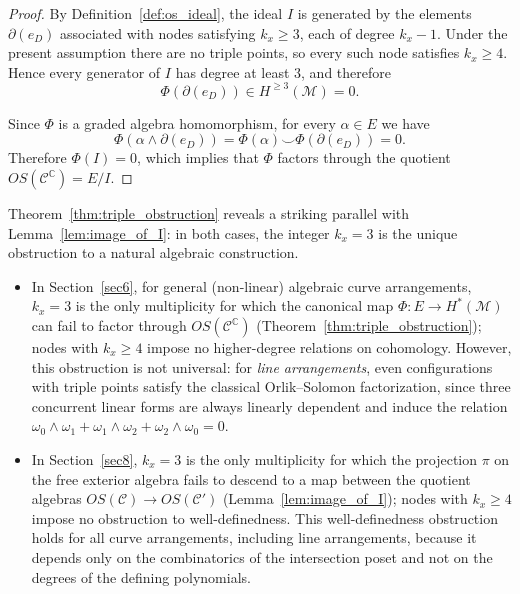 \documentclass[article,11pt]{amsart} \numberwithin{equation}{section}
\numberwithin{equation}{section}
\begin{document}
{\begin{proof}
	By Definition~\ref{def:os_ideal},
	the ideal
	$I$
	is generated by the elements
	$\partial(e_D)$
	associated with nodes satisfying
	$k_x\ge3$,
	each of degree
	$k_x-1$.
	Under the present assumption there are no triple points, so every such node satisfies
	$k_x\ge4$.
	Hence every generator of
	$I$
	has degree at least $3$, and therefore
	\[
	\Phi(\partial(e_D))
	\in
	H^{\ge3}(\mathcal M)
	=
	0.
	\]
	
	Since
	$\Phi$
	is a graded algebra homomorphism,
	for every
	$\alpha\in E$
	we have
	\[
	\Phi(\alpha\wedge\partial(e_D))
	=
	\Phi(\alpha)
	\smile
	\Phi(\partial(e_D))
	=
	0.
	\]
	Therefore
	$\Phi(I)=0$,
	which implies that
	$\Phi$
	factors through the quotient
	$OS(\mathcal C^{\mathbb C})=E/I$.
\end{proof}

\begin{rk}
	\label{rmk:unifying_kx3}
	Theorem~\ref{thm:triple_obstruction} reveals a striking parallel with Lemma~\ref{lem:image_of_I}: in both cases, the integer $k_x=3$ is the unique obstruction to a natural algebraic construction.
	\begin{itemize}
		\item In Section~\ref{sec6}, for general (non-linear) algebraic curve arrangements, $k_x=3$ is the only multiplicity for which the canonical map $\Phi:E\longrightarrow H^*(\mathcal M)$ can fail to factor through $OS(\mathcal C^{\mathbb C})$ (Theorem~\ref{thm:triple_obstruction}); nodes with $k_x\ge4$ impose no higher-degree relations on cohomology. However, this obstruction is not universal: for \emph{line arrangements}, even configurations with triple points satisfy the classical Orlik--Solomon factorization, since three concurrent linear forms are always linearly dependent and induce the relation $\omega_0\wedge\omega_1+\omega_1\wedge\omega_2+\omega_2\wedge\omega_0=0$.
		\item In Section~\ref{sec8}, $k_x=3$ is the only multiplicity for which the projection $\pi$ on the free exterior algebra fails to descend to a map between the quotient algebras $OS(\mathcal C)\longrightarrow OS(\mathcal C')$ (Lemma~\ref{lem:image_of_I}); nodes with $k_x\ge4$ impose no obstruction to well-definedness. This well-definedness obstruction holds for all curve arrangements, including line arrangements, because it depends only on the combinatorics of the intersection poset and not on the degrees of the defining polynomials.
	\end{itemize}

\end{rk}}
\end{document}
